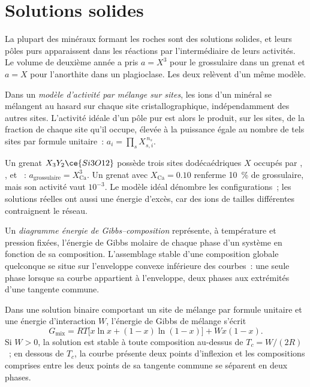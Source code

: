 \section{Solutions solides}\label{sec:b3:petrological-thermodynamics:solutions}

La plupart des minéraux formant les roches sont des solutions solides, et leurs pôles purs
apparaissent dans les réactions par l'intermédiaire de leurs activités. Le volume de deuxième année a pris $a = X^3$ pour
le grossulaire dans un grenat et $a = X$ pour l'anorthite dans un plagioclase.
Les deux relèvent d'un même modèle.

\begin{definition}\label{def:b3:petrological-thermodynamics:site-mixing}
Dans un \emph{modèle d'activité par mélange sur sites}, les
ions d'un minéral se mélangent au hasard sur chaque site cristallographique, indépendamment
des autres sites. L'activité idéale d'un pôle pur est alors le produit,
sur les sites, de la fraction de chaque site qu'il occupe, élevée à la puissance
égale au nombre de tels sites par formule unitaire~: $a_i = \prod_s X_{s,i}^{\,n_s}$.
\end{definition}

Un grenat $X_3Y_2\ce{Si3O12}$ possède trois sites dodécaédriques $X$ occupés par
, ,  et ~: $a_{\text{grossulaire}} =
X_{\text{Ca}}^3$. Un grenat avec $X_{\text{Ca}} = 0.10$ renferme
\qty{10}{\percent} de grossulaire, mais son activité vaut $10^{-3}$. Le
modèle idéal dénombre les configurations~; les solutions réelles ont aussi une énergie d'excès,
car des ions de tailles différentes contraignent le réseau.

\begin{definition}\label{def:b3:petrological-thermodynamics:gx}
Un \emph{diagramme énergie de Gibbs--composition}
représente, à température et pression fixées, l'énergie de Gibbs molaire de
chaque phase d'un système en fonction de sa composition. L'assemblage stable
d'une composition globale quelconque se situe sur l'enveloppe convexe inférieure des courbes~:
une seule phase lorsque sa courbe appartient à l'enveloppe, deux phases aux extrémités d'une tangente commune.
\end{definition}

\begin{proposition}\label{prop:b3:petrological-thermodynamics:regular}
Dans une solution binaire comportant un site de mélange par formule unitaire et
une énergie d'interaction $W$, l'énergie de Gibbs de mélange s'écrit
\[
  G_{\text{mix}} = RT\bigl[x\ln x + (1 - x)\ln(1 - x)\bigr] + Wx(1 - x).
\]
Si $W > 0$, la solution est stable à toute composition au-dessus de $T_c =
W/(2R)$~; en dessous de $T_c$, la courbe présente deux points d'inflexion et
les compositions comprises entre les deux points de sa tangente commune se séparent en deux phases.
\end{proposition}

